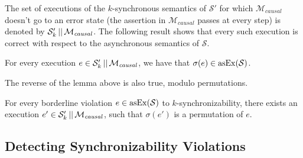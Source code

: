 The set of executions of the $k$-synchronous semantics of $\mathcal{S'}$ for which $\mathcal{M}_{\mathit{causal}}$ doesn't go to an error state (the assertion in $\mathcal{M}_{\mathit{causal}}$ passes at every step) is denoted by $\mathcal{S}_k' \,||\,\mathcal{M}_{\mathit{causal}}$. The following result shows that every such execution is correct with respect to the asynchronous semantics of $\mathcal{S}$.

\begin{lemma}
For every execution $e\in \mathcal{S}_k' \,||\,\mathcal{M}_{\mathit{causal}}$, we have that $\sigma(e)\in \mathrm{asEx}({\mathcal{S}})$.
\end{lemma}

The reverse of the lemma above is also true, modulo permutations.

\begin{lemma}
For every borderline violation $e\in \mathrm{asEx}({\mathcal{S}})$ to $k$-synchronizability, there exists an execution $e'\in \mathcal{S}_k' \,||\,\mathcal{M}_{\mathit{causal}}$, such that $\sigma(e')$ is a permutation of $e$.
\end{lemma}

\subsection{Detecting Synchronizability Violations}\label{asec:violations}

